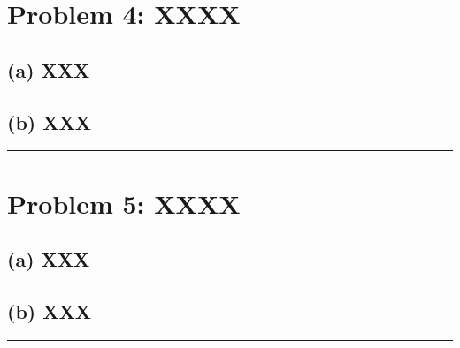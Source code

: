 \documentclass[11pt]{article}
\begin{document}
\newpage

\section*{Problem 4: XXXX}

\subsection*{(a) XXX}


\subsection*{(b) XXX}



\bigskip
\hrule
\bigskip

\newpage

\section*{Problem 5: XXXX}

\subsection*{(a) XXX}


\subsection*{(b) XXX}



\bigskip
\hrule
\bigskip

\newpage
\end{document}
